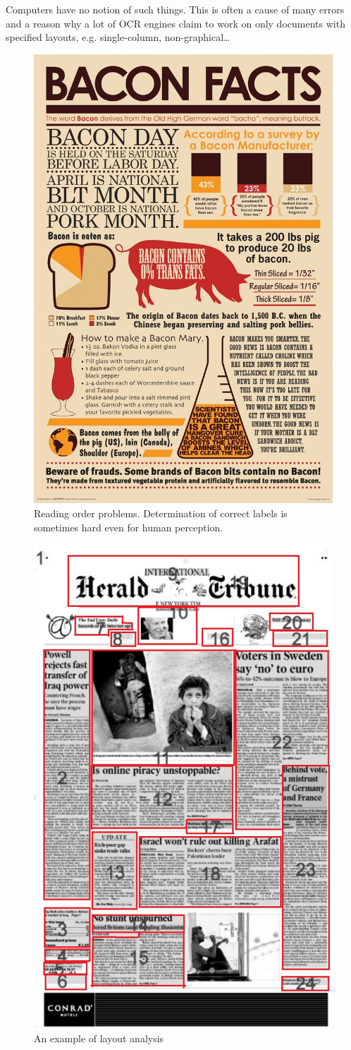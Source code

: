 Computers have no notion of such things. This is often a cause of many errors and a reason why a lot of OCR engines claim to work on only documents with specified layouts, e.g. single-column, non-graphical\ldots

\begin{figure}[t]
\centering
\includegraphics[width=0.5\linewidth]{img/tableDetection/readingOrderIssue.jpg}
\caption{Reading order problems. Determination of correct labels is sometimes hard even for human perception.} \label{fig:readingOrderProblems}
\end{figure}

\begin{figure}[t]
\centering
\includegraphics[width=0.5\linewidth]{img/tableDetection/readingOrder.jpg}
\caption{An example of layout analysis~\citep{hadjar2004xed}}
\label{fig:readingOrderExample}
\end{figure}

